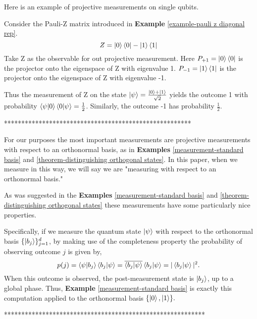 {Here is an example of projective measurements on single qubits.
\begin{example}
Consider the Pauli-Z matrix introduced in \textbf{Example} \ref{example-pauli z diagonal rep}.
\begin{equation}
    Z=\ket{0}\bra{0}-\ket{1}\bra{1}
\end{equation}
Take Z as the observable for out projective measurement. Here $P_{+1}=\ket{0}\bra{0}$ is the projector onto the eigenspace of Z with eigenvalue 1. $P_{-1}=\ket{1}\bra{1}$ is the projector onto the eigenspace of Z with eigenvalue -1.

Thus the measurement of Z on the state $\ket{\psi}=\frac{\ket{0}+\ket{1}}{\sqrt{2}}$ yields the outcome 1 with probability $\braket{\psi|0}\braket{0|\psi}=\frac{1}{2}$. Similarly, the outcome -1 has probability $\frac{1}{2}$.
\end{example}

******************************************************


For our purposes the most important measurements are projective measurements with respect to an orthonormal basis, as in \textbf{Examples} \ref{measurement-standard basis} and \ref{theorem-distinguishing orthogonal states}.  In this paper, when we measure in this way, we will say we are "measuring with respect to an orthonormal basis."



As was suggested in the {\bf{Examples}} \ref{measurement-standard basis} and \ref{theorem-distinguishing orthogonal states} these measurements have some particularly nice properties.

 Specifically, if we measure the quantum state $\ket{\psi}$ with respect to the orthonormal basis $\{\ket{b_j}\}_{j=1}^d$, by making use of the completeness property the probability of observing outcome $j$ is given by,
 \begin{equation}
 p(j)=\braket{\psi|b_j}\braket{b_j|\psi}= \overline{\braket{b_j|\psi}}\braket{b_j|\psi}= |\braket{b_j|\psi}|^2.
 \end{equation}
 When this outcome is observed, the post-measurement state is $\ket{b_j}$, up to a global phase.  Thus, \textbf{Example} \ref{measurement-standard basis} is exactly this computation applied to the orthonormal basis $\{\ket{0},\ket{1}\}.$

**********************************************************


}
